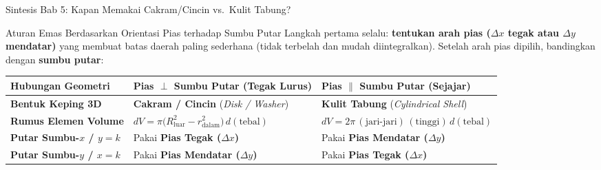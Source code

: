 \documentclass[aspectratio=43,10pt]{beamer}
\begin{document}
\begin{frame}{Sintesis Bab 5: Kapan Memakai Cakram/Cincin vs.\ Kulit Tabung?}
    \begin{block}{Aturan Emas Berdasarkan Orientasi Pias terhadap Sumbu Putar}
        \scriptsize
        Langkah pertama selalu: \textbf{tentukan arah pias ($\Delta x$ tegak atau $\Delta y$ mendatar)} yang membuat batas daerah paling sederhana (tidak terbelah dan mudah diintegralkan). Setelah arah pias dipilih, bandingkan dengan \textbf{sumbu putar}:
        \vskip 3pt
        \renewcommand{\arraystretch}{1.45}
        \centering
        \begin{tabular}{@{}p{}p{}p{}@{}}
            \textbf{Hubungan Geometri} & \textbf{Pias $\perp$ Sumbu Putar (Tegak Lurus)} & \textbf{Pias $\parallel$ Sumbu Putar (Sejajar)}\\\hline
            \textbf{Bentuk Keping 3D} & \textbf{Cakram / Cincin} (\textit{Disk / Washer}) & \textbf{Kulit Tabung} (\textit{Cylindrical Shell})\\
            \textbf{Rumus Elemen Volume} & $dV = \pi\big(R_{\text{luar}}^2 - r_{\text{dalam}}^2\big)\,d(\text{tebal})$ & $dV = 2\pi\,(\text{jari-jari})\,(\text{tinggi})\,d(\text{tebal})$\\
            \textbf{Putar Sumbu-$x$ / $y = k$} & Pakai \textbf{Pias Tegak ($\Delta x$)} & Pakai \textbf{Pias Mendatar ($\Delta y$)}\\
            \textbf{Putar Sumbu-$y$ / $x = k$} & Pakai \textbf{Pias Mendatar ($\Delta y$)} & Pakai \textbf{Pias Tegak ($\Delta x$)}\\
        \end{tabular}
    \end{block}
\end{frame}
\end{document}
